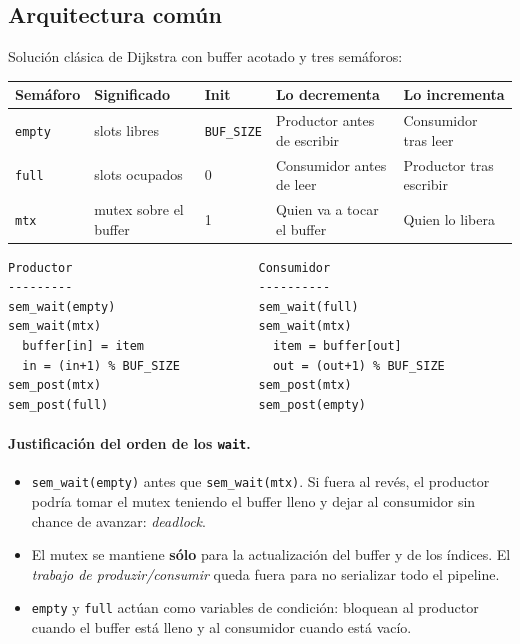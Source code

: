 \documentclass[11pt,a4paper]{article}
\begin{document}
\subsection*{Arquitectura común}

Solución clásica de Dijkstra con buffer acotado y tres semáforos:

\begin{center}
\small
\begin{tabular}{@{}llllp{4.5cm}@{}}
\toprule
Semáforo & Significado & Init & Lo decrementa & Lo incrementa \\
\midrule
\texttt{empty} & slots libres   & \texttt{BUF\_SIZE} & Productor antes de escribir & Consumidor tras leer \\
\texttt{full}  & slots ocupados & 0                  & Consumidor antes de leer    & Productor tras escribir \\
\texttt{mtx}   & mutex sobre el buffer & 1          & Quien va a tocar el buffer  & Quien lo libera \\
\bottomrule
\end{tabular}
\end{center}

\begin{lstlisting}[style=textstyle]
Productor                          Consumidor
---------                          ----------
sem_wait(empty)                    sem_wait(full)
sem_wait(mtx)                      sem_wait(mtx)
  buffer[in] = item                  item = buffer[out]
  in = (in+1) % BUF_SIZE             out = (out+1) % BUF_SIZE
sem_post(mtx)                      sem_post(mtx)
sem_post(full)                     sem_post(empty)
\end{lstlisting}

\paragraph{Justificación del orden de los \texttt{wait}.}

\begin{itemize}[leftmargin=*,nosep]
    \item \texttt{sem\_wait(empty)} antes que \texttt{sem\_wait(mtx)}.
        Si fuera al revés, el productor podría tomar el mutex teniendo
        el buffer lleno y dejar al consumidor sin chance de avanzar:
        \emph{deadlock}.
    \item El mutex se mantiene \textbf{sólo} para la actualización del
        buffer y de los índices. El \emph{trabajo de produzir/consumir}
        queda fuera para no serializar todo el pipeline.
    \item \texttt{empty} y \texttt{full} actúan como variables de
        condición: bloquean al productor cuando el buffer está lleno y
        al consumidor cuando está vacío.
\end{itemize}
\end{document}
